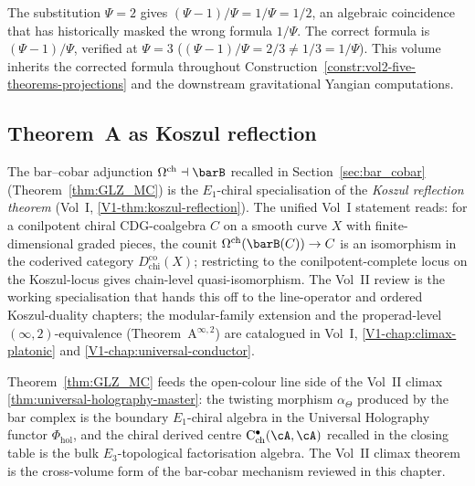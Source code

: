\begin{remark}[Coincidence at $\Psi=2$ flagged]
\label{rem:bar-cobar-review-psi2-coincidence}
The substitution $\Psi=2$ gives $(\Psi-1)/\Psi = 1/\Psi = 1/2$, an
algebraic coincidence that has historically masked the wrong
formula $1/\Psi$. The correct formula is $(\Psi-1)/\Psi$, verified
at $\Psi=3$ ($(\Psi-1)/\Psi=2/3 \ne 1/3=1/\Psi$). This volume
inherits the corrected formula throughout
Construction~\ref{constr:vol2-five-theorems-projections} and the
downstream gravitational Yangian computations.
\end{remark}

\subsection{Theorem~A as Koszul reflection}
\label{subsec:bar-cobar-review-koszul-reflection-anchor}

\begin{remark}
\label{rem:bar-cobar-review-koszul-reflection}
The bar--cobar adjunction
$\Omega^{\mathrm{ch}} \dashv \barB$ recalled in
Section~\ref{sec:bar_cobar} (Theorem~\ref{thm:GLZ_MC}) is the
$E_1$-chiral specialisation of the \emph{Koszul reflection
theorem} (Vol~I, \cref{V1-thm:koszul-reflection}). The unified
Vol~I statement reads: for a conilpotent chiral
$\mathrm{CDG}$-coalgebra $C$ on a smooth curve $X$ with
finite-dimensional graded pieces, the counit
$\Omega^{\mathrm{ch}}(\barB(C)) \to C$ is an isomorphism in the
coderived category $D^{\mathrm{co}}_{\mathrm{chi}}(X)$; restricting
to the conilpotent-complete locus on the Koszul-locus gives
chain-level quasi-isomorphism. The Vol~II review is the working
specialisation that hands this off to the line-operator and
ordered Koszul-duality chapters; the modular-family extension and
the properad-level $(\infty,2)$-equivalence (Theorem~A$^{\infty,2}$)
are catalogued in Vol~I, \cref{V1-chap:climax-platonic} and
\cref{V1-chap:universal-conductor}.
\end{remark}

\begin{remark}
\label{rem:bar-cobar-review-uhm-bridge}
Theorem~\ref{thm:GLZ_MC} feeds the open-colour line side of the
Vol~II climax \cref{thm:universal-holography-master}: the twisting
morphism $\alpha_\Theta$ produced by the bar complex is the
boundary $E_1$-chiral algebra in the Universal Holography
functor $\Phi_{\mathrm{hol}}$, and the chiral derived centre
$\mathrm{C}^\bullet_{\mathrm{ch}}(\cA,\cA)$ recalled in the closing
table is the bulk $E_3$-topological factorisation algebra.
The Vol~II climax theorem is the cross-volume form of the
bar-cobar mechanism reviewed in this chapter.
\end{remark}

